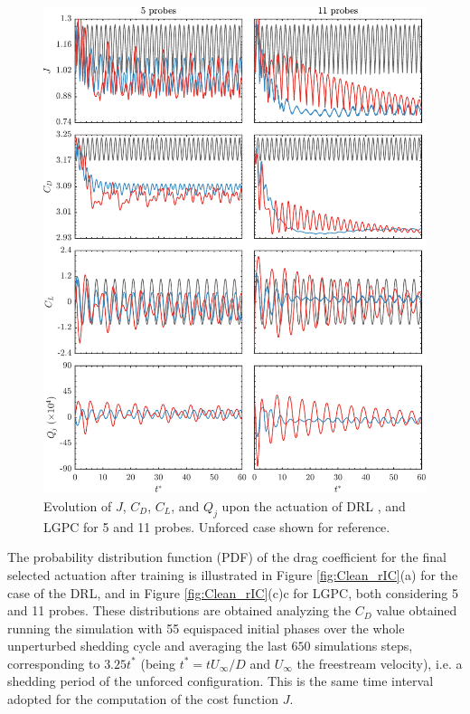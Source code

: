 \begin{figure}[t]
    \centering
    \includegraphics[width=0.9\linewidth]{Figures/5.pdf}
    \caption{Evolution of $J$, $C_D$, $C_L$, and $Q_j$ upon the actuation of DRL , and LGPC  for 5 and 11 probes. Unforced case  shown for reference.}
    \label{fig:Clean_rIC_history}
\end{figure}

The probability distribution function (PDF) of the drag coefficient for the final selected actuation after training is illustrated in Figure \ref{fig:Clean_rIC}(a) for the case of the DRL, and in Figure \ref{fig:Clean_rIC}(c)c for LGPC, both considering 5 and 11 probes. These distributions are obtained analyzing the $C_D$ value obtained running the simulation with 55 equispaced initial phases over the whole unperturbed shedding cycle and averaging the last $650$ simulations steps, corresponding to $3.25t^*$ (being $t^* = t U_\infty/D$ and $U_\infty$ the freestream velocity), i.e. a shedding period of the unforced configuration. This is the same time interval adopted for the computation of the cost function $J$.

